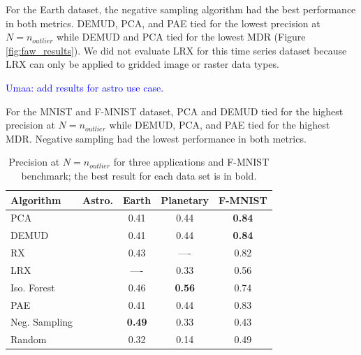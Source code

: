 \documentclass[letterpaper]{article} %
\newcommand{\todo}[1]{\textcolor{blue}{#1}}
\begin{document}
For the Earth dataset, the negative sampling algorithm had the best performance
in both metrics. DEMUD, PCA, and PAE tied for the lowest precision at 
$N=n_{outlier}$ while DEMUD and PCA tied for the lowest
MDR (Figure \ref{fig:faw_results}). We did not evaluate LRX for this time 
series dataset because LRX can only be applied to gridded image or raster 
data types.

\todo{Umaa: add results for astro use case.}

For the MNIST and F-MNIST dataset, PCA and DEMUD tied for the highest
 precision at $N=n_{outlier}$
while DEMUD, PCA, and PAE tied for the highest MDR. Negative sampling had the 
lowest performance in both metrics. 

\begin{table}
  \caption{Precision at $N=n_{outlier}$ for three applications and F-MNIST
   benchmark; the best result for each data set is in bold.}
  \label{tab:faw_results}
  \centering
  \begin{tabular}{l|cccc}
    \hline
    Algorithm & Astro. & Earth & Planetary & F-MNIST \\
    \hline
    PCA               & & 0.41 & 0.44 & \textbf{0.84} \\
    DEMUD             & & 0.41 & 0.44 & \textbf{0.84} \\
    \hline
    RX                & & 0.43 & ---- & 0.82 \\
    LRX               & & ---- & 0.33 & 0.56 \\
    \hline
    Iso. Forest  & & 0.46 & \textbf{0.56} & 0.74 \\
    \hline
    PAE               & & 0.41 & 0.44 & 0.83 \\
    Neg. Sampling & & \textbf{0.49} & 0.33 & 0.43 \\
    \hline
    Random            & & 0.32 & 0.14 & 0.49 \\
    \hline
  \end{tabular}
\end{table}
\end{document}

